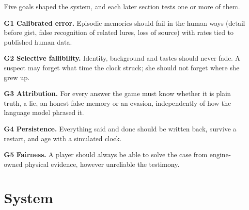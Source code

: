 \documentclass[conference]{IEEEtran}
\begin{document}
Five goals shaped the system, and each later section tests one or more of them.

\textbf{G1 Calibrated error.} Episodic memories should fail in the human ways (detail before gist,
false recognition of related lures, loss of source) with rates tied to published human data.

\textbf{G2 Selective fallibility.} Identity, background and tastes should never fade. A suspect may
forget what time the clock struck; she should not forget where she grew up.

\textbf{G3 Attribution.} For every answer the game must know whether it is plain truth, a lie, an
honest false memory or an evasion, independently of how the language model phrased it.

\textbf{G4 Persistence.} Everything said and done should be written back, survive a restart, and age
with a simulated clock.

\textbf{G5 Fairness.} A player should always be able to solve the case from engine-owned physical
evidence, however unreliable the testimony.

\section{System}
\label{sec:system}
\end{document}
